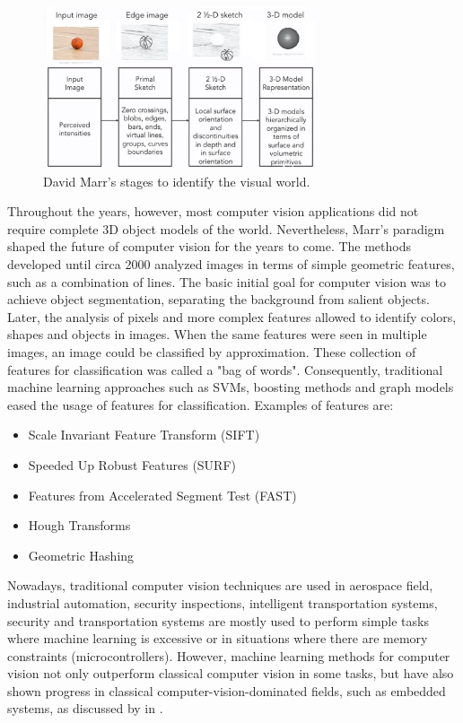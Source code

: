 \begin{figure}[!ht]
        \centering
        \includegraphics[width=0.72\textwidth]{images/marr-stages}
        \caption{David Marr's stages to identify the visual world.}
        \label{fig:marr-stages}
    \end{figure}
    
Throughout the years, however, most computer vision applications did not require complete 3D object models of the world. Nevertheless, Marr's paradigm shaped the future of computer vision for the years to come. The methods developed until circa 2000 analyzed images in terms of simple geometric features, such as a combination of lines.
The basic initial goal for computer vision was to achieve object segmentation, separating the background from salient objects. Later, the analysis of pixels and more complex features allowed to identify colors, shapes and objects in images. When the same features were seen in multiple images, an image could be classified by approximation. These collection of features for classification was called a "bag of words". Consequently, traditional machine learning approaches such as SVMs, boosting methods and graph models eased the usage of features for classification. Examples of features are:
\begin{itemize}
    \item Scale Invariant Feature Transform (SIFT) \cite{karami2017image}
    \item Speeded Up Robust Features (SURF) \cite{bay2006surf}
    \item Features from Accelerated Segment Test (FAST) \cite{rosten2006machine}
    \item Hough Transforms \cite{goldenshluger2004hough}
    \item Geometric Hashing \cite{tsai1994geometric}

\end{itemize}
Nowadays, traditional computer vision techniques are used in aerospace field, industrial automation, security inspections, intelligent transportation systems, security and transportation systems \citeauthor{bhargava2018fruits} are mostly used to perform simple tasks where machine learning is excessive or in situations where there are memory constraints (microcontrollers). However, machine learning methods for computer vision not only outperform classical computer vision in some tasks, but have also shown progress in classical computer-vision-dominated fields, such as embedded systems, as discussed by \textcite{zhang2019skynet} in . 

